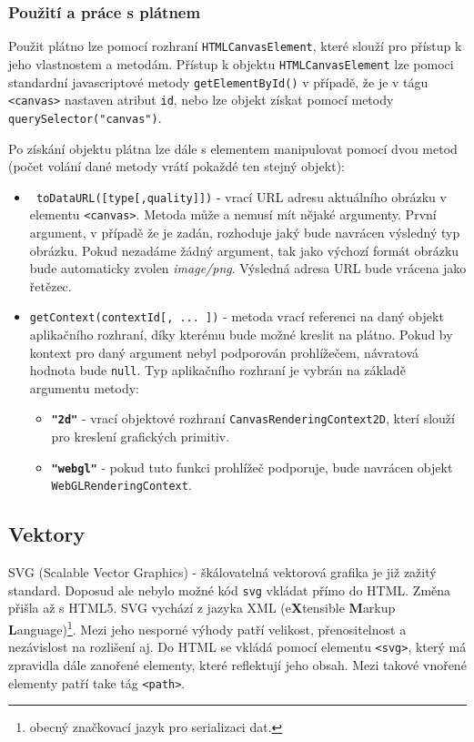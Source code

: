 \subsubsection{Použití a práce s plátnem}
Použit plátno lze pomocí rozhraní \texttt{HTMLCanvasElement}, které slouží pro přístup k jeho vlastnostem a metodám. Přístup k objektu \texttt{HTMLCanvasElement} lze pomoci standardní javascriptové metody \texttt{getElementById()} v případě, že je v tágu \texttt{<canvas>} nastaven atribut \texttt{id}, nebo lze objekt získat pomocí metody \texttt{querySelector("canvas")}.

Po získání objektu plátna lze dále s elementem manipulovat pomocí dvou metod (počet volání dané metody vrátí pokaždé ten stejný objekt):
	 	\begin{itemize}		
			\item \texttt{ toDataURL([type[,quality]])} \cite{html5}\newline
			 - vrací URL adresu aktuálního obrázku v elementu \texttt{<canvas>}. Metoda může a nemusí mít nějaké argumenty. První argument, v případě že je zadán, rozhoduje jaký bude navrácen výsledný typ obrázku. Pokud nezadáme žádný argument, tak jako výchozí formát obrázku bude automaticky zvolen \textit{image/png}. Výsledná adresa URL bude vrácena jako řetězec.
			\item \texttt{getContext(contextId[, ... ])}\newline
			 - metoda vrací referenci na daný objekt aplikačního rozhraní, díky kterému bude možné kreslit na plátno. Pokud by kontext pro daný argument nebyl podporován prohlížečem, návratová hodnota bude \texttt{null}. Typ aplikačního rozhraní je vybrán na základě argumentu metody:
			 \begin{itemize}
			 	\item  \texttt{\textbf{"2d"}} - vrací objektové rozhraní \texttt{CanvasRenderingContext2D}, kterí slouží pro kreslení grafických primitiv.
			 	\item \texttt{\textbf{"webgl"}} - pokud tuto funkci prohlížeč podporuje, bude navrácen objekt \newline \texttt{WebGLRenderingContext}. 
			 \end{itemize}
		 
 
		\end{itemize}

\newpage


\subsection{Vektory}
SVG (Scalable Vector Graphics) - škálovatelná vektorová grafika je již zažitý standard. Doposud ale nebylo možné kód \texttt{svg} vkládat přímo do HTML. Změna přišla až s HTML5. SVG vychází z jazyka XML (e\textbf{X}tensible \textbf{M}arkup \textbf{L}anguage)\footnote{obecný značkovací jazyk pro serializaci dat.}. Mezi jeho nesporné výhody patří velikost, přenositelnost a nezávislost na rozlišení aj. Do HTML se vkládá pomocí elementu \texttt{<svg>}, který má zpravidla dále zanořené elementy, které reflektují jeho obsah. Mezi takové vnořené elementy patří take tág \texttt{<path>}.


